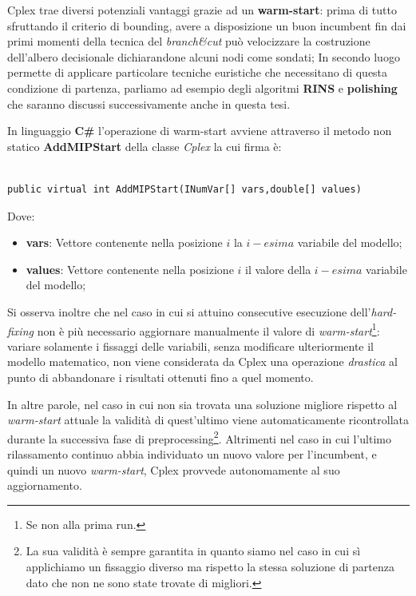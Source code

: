 \documentclass[11pt]{article}
\begin{document}
Cplex trae diversi potenziali vantaggi grazie ad un \textbf{warm-start}: prima di tutto sfruttando il criterio di bounding, avere a disposizione un buon incumbent fin dai primi momenti della tecnica del \textit{branch\&cut} può velocizzare la costruzione dell'albero decisionale dichiarandone alcuni nodi come sondati; In secondo luogo permette di applicare particolare tecniche euristiche che necessitano di questa condizione di partenza, parliamo ad esempio degli algoritmi \textbf{RINS} e \textbf{polishing} che saranno discussi successivamente anche in questa tesi.

In linguaggio \textbf{C\#} l'operazione di warm-start avviene attraverso il metodo non statico \textbf{AddMIPStart} della classe \textit{Cplex} la cui firma è:

\begin{lstlisting}

public virtual int AddMIPStart(INumVar[] vars,double[] values)

\end{lstlisting}

Dove:

\begin{itemize}
    \item \textbf{vars}: Vettore contenente nella posizione $i$ la $i-esima$ variabile del modello;
    \item \textbf{values}: Vettore contenente nella posizione $i$ il valore della $i-esima$ variabile del modello;
\end{itemize}

Si osserva inoltre che nel caso in cui si attuino consecutive esecuzione dell'\textit{hard-fixing} non è più necessario aggiornare manualmente il valore di \textit{warm-start}\footnote{Se non alla prima run.}: variare solamente i fissaggi delle variabili, senza modificare ulteriormente il modello matematico, non viene considerata da Cplex una operazione \textit{drastica} al punto di abbandonare i risultati ottenuti fino a quel momento.

In altre parole, nel caso in cui non sia trovata una soluzione migliore rispetto al \textit{warm-start} attuale la validità di quest'ultimo viene automaticamente ricontrollata durante la successiva fase di preprocessing\footnote{La sua validità è sempre garantita in quanto siamo nel caso in cui sì applichiamo un fissaggio diverso ma rispetto la stessa soluzione di partenza dato che non ne sono state trovate di migliori.}. Altrimenti nel caso in cui l'ultimo rilassamento continuo abbia individuato un nuovo valore per l'incumbent, e quindi un nuovo \textit{warm-start}, Cplex provvede autonomamente al suo aggiornamento.
\end{document}
